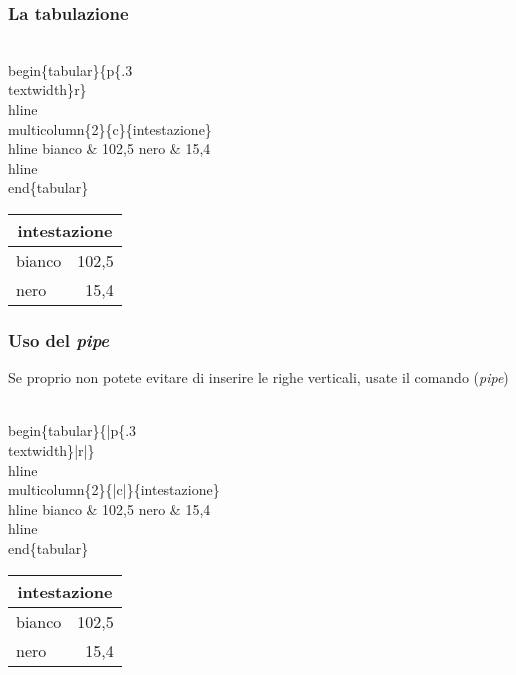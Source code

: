 \begin{frame}
  \frametitle{La tabulazione}
	\begin{LaTeXcode}
		\\begin\{tabular\}\{\alert{p\{.3\\textwidth\}}r\}\
		\\hline \n
		\\multicolumn\{2\}\{c\}\{intestazione\}\bs\bs \
		\\hline \n
		\hspace*{5ex}bianco \& 102,5 \bs\bs\n
		\hspace*{5ex}nero   \& 15,4 \bs\bs\
		\\hline\n
		\\end\{tabular\}
	\end{LaTeXcode}
	\begin{LaTeXoutput}
		\begin{tabular}{p{.3\textwidth}r}\hline
		\multicolumn{2}{c}{intestazione}\\\hline
		bianco & 102,5 \\
		nero   & 15,4 \\\hline
		\end{tabular}
	\end{LaTeXoutput}
\end{frame}
\begin{frame}
  \frametitle{Uso del \textit{pipe}}
	Se proprio non potete evitare di inserire le righe verticali, usate il comando \LCmd[]{|} (\textit{pipe})
	\begin{LaTeXcode}
		\\begin\{tabular\}\{\alert{|}p\{.3\\textwidth\}\alert{|}r\alert{|}\}\
		\\hline \n
		\\multicolumn\{2\}\{\alert{|}c\alert{|}\}\{intestazione\}\bs\bs \
		\\hline \n
		\hspace*{5ex}bianco \& 102,5 \bs\bs\n
		\hspace*{5ex}nero   \& 15,4 \bs\bs\
		\\hline\n
		\\end\{tabular\}
	\end{LaTeXcode}
	\begin{LaTeXoutput}
		\begin{tabular}{|p{}|r|}\hline
		\multicolumn{2}{|c|}{intestazione}\\\hline
		bianco & 102,5 \\
		nero   & 15,4 \\\hline
		\end{tabular}
	\end{LaTeXoutput}
\end{frame}

